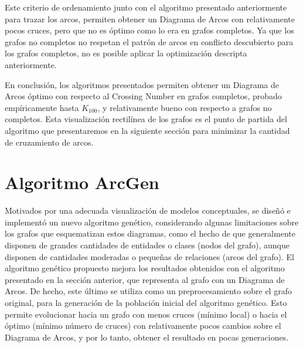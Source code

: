 	
	Este criterio de ordenamiento junto con el algoritmo presentado anteriormente  para trazar los arcos, permiten obtener un Diagrama de Arcos con relativamente pocos cruces, pero que  no es óptimo  como lo era en grafos completos. Ya que los grafos no completos  no respetan el patrón de arcos en conflicto descubierto para los grafos completos, 
	no es posible aplicar la optimización descripta anteriormente.
	
	En conclusión, los algoritmos presentados  permiten  obtener un Diagrama de Arcos óptimo con respecto al Crossing Number en grafos completos, probado empíricamente hasta $K_{100}$, y relativamente bueno con respecto a grafos no completos. Esta visualización rectilínea de los grafos es el  punto de partida del algoritmo  que presentaremos en la siguiente sección para minimizar la cantidad de cruzamiento de arcos. 
	

\section{Algoritmo ArcGen}

	
	Motivados por una adecuada visualización de  modelos conceptuales, se diseñó e implementó  un nuevo algoritmo genético, considerando algunas limitaciones sobre los grafos que esquematizan estos diagramas, como el  hecho de que 
	generalmente disponen de  grandes cantidades de entidades o clases (nodos del grafo), aunque disponen de cantidades moderadas o pequeñas de relaciones (arcos del grafo).
	El  algoritmo genético propuesto  mejora los resultados obtenidos con el algoritmo presentado en la sección anterior, que representa al grafo  con un Diagrama de Arcos. De hecho, este último se utiliza como un preprocesamiento sobre el grafo original,  para la generación de la población inicial del algoritmo genético.  Esto permite evolucionar  hacia  un grafo  con menos cruces (mínimo local) o  hacia el óptimo (mínimo número de cruces)  con  relativamente pocos cambios sobre el Diagrama de Arcos, y por lo tanto, obtener el resultado en  pocas generaciones. %
	
